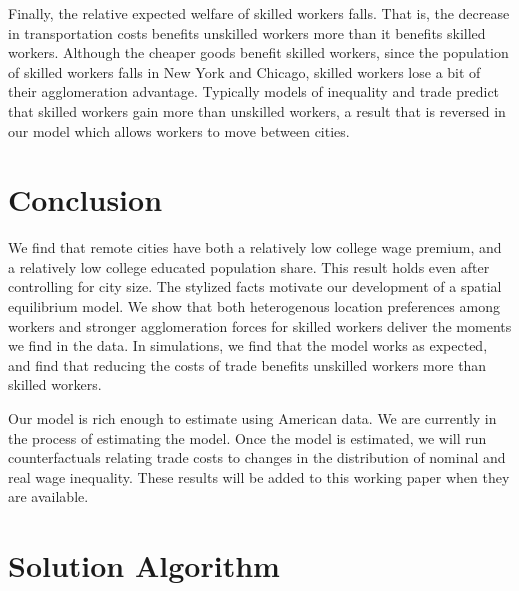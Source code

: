 \documentclass[12 pt]{article}
\begin{document}
Finally, the relative expected welfare of skilled workers falls.  That is, the decrease in transportation costs benefits unskilled workers more than it benefits skilled workers.  Although the cheaper goods benefit skilled workers, since the population of skilled workers falls in New York and Chicago, skilled workers lose a bit of their agglomeration advantage.  Typically models of inequality and trade predict that skilled workers gain more than unskilled workers, a result that is reversed in our model which allows workers to move between cities.


\section{Conclusion}

We find that remote cities have both a relatively low college wage premium, and a relatively low college educated population share.  This result holds even after controlling for city size.  The stylized facts motivate our development of a spatial equilibrium model.  We show that both heterogenous location preferences among workers and stronger agglomeration forces for skilled workers deliver the moments we find in the data.  In simulations, we find that the model works as expected, and find that reducing the costs of trade benefits unskilled workers more than skilled workers.

Our model is rich enough to estimate using American data.  We are currently in the process of estimating the model.  Once the model is estimated, we will run counterfactuals relating trade costs to changes in the distribution of nominal and real wage inequality.  These results will be added to this working paper when they are available.

\newpage


%


\appendix
\section{Solution Algorithm}
\label{sec:sol_alg}
\end{document}
